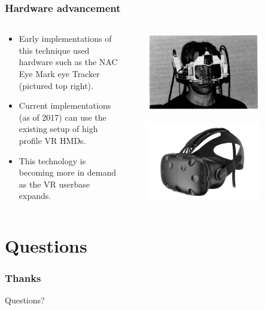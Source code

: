 \documentclass{beamer}
\newcommand{\linespace}{\vskip 0.25cm}
\begin{document}
\begin{frame}
\frametitle{Hardware advancement}

\begin{columns}
\begin{column}{0.5\textwidth}

\begin{itemize}
	\item Early implementations of this technique used hardware such as the NAC Eye Mark eye Tracker (pictured top right).
	\linespace
	\item Current implementations (as of 2017) can use the existing setup of high profile VR HMDs.
	\linespace
	\item This technology is becoming more in demand as the VR userbase expands.
\end{itemize}
\end{column}

\begin{column}{0.02\textwidth}
\end{column}

\begin{column}{0.5\textwidth}

\includegraphics[width=0.715\textwidth]{Illustrations/gazeTracker.png}

\includegraphics[width=0.715\textwidth]{Illustrations/vive.png}

\end{column}
\end{columns}

\end{frame}

\section[Conclusion]{Questions}

\begin{frame}
	\frametitle{Thanks}

	\begin{center}
	{\huge Questions?}
	\end{center}
\end{frame}
\end{document}
